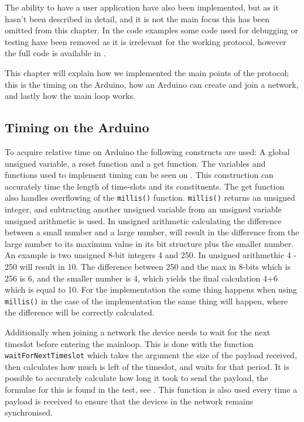 \noindent
The ability to have a user application have also been implemented, but as it hasn't been described in detail, and it is not the main focus this has been omitted from this chapter.
In the code examples some code used for debugging or testing have been removed as it is irrelevant for the working protocol, however the full code is available in . 

This chapter will explain how we implemented the main points of the protocol; this is the timing on the Arduino, how an Arduino can create and join a network, and lastly how the main loop works. 

\subsection{Timing on the Arduino}
To acquire relative time on Arduino the following constructs are used: A global unsigned variable, a reset function and a get function.
The variables and functions used to implement timing can be seen on .
This construction can accurately time the length of time-slots and its constituents. 
 The get function also handles overflowing of the \texttt{millis()} function. \texttt{millis()} returns an unsigned integer, and subtracting another unsigned variable from an unsigned variable unsigned arithmetic is used. In unsigned arithmetic calculating the difference between a small number and a large number, will result in the difference from the large number to its maximum value in its bit structure plus the smaller number. An example is two unsigned 8-bit integers 4 and 250. In unsigned arithmethic 4 - 250 will result in 10. The difference between 250 and the max in 8-bits which is 256 is 6, and the smaller number is 4, which yields the final calculation 4+6 which is equal to 10. For the implementation the same thing happens when using \texttt{millis()} in the case of the implementation the same thing will happen, where the difference will be correctly calculated.

 
Additionally when joining a network the device needs to wait for the next timeslot before entering the mainloop. 
This is done with the function \texttt{waitForNextTimeslot} which takes the argument the size of the payload received, then calculates how much is left of the timeslot, and waits for that period. 
It is possible to accurately calculate how long it took to send the payload, the formulae for this is found in the test, see  .
This function is also used every time a payload is received to ensure that the devices in the network remains synchronised. 

